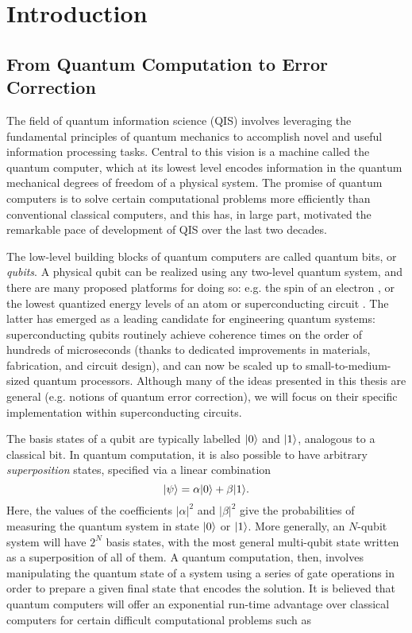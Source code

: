 \chapter{Introduction\label{ch:1_Introduction}}

\section{From Quantum Computation to Error Correction}

The field of quantum information science (QIS) involves leveraging the fundamental principles of quantum mechanics to accomplish novel and useful information processing tasks. Central to this vision is a machine called the quantum computer, which at its lowest level encodes information in the quantum mechanical degrees of freedom of a physical system. The promise of quantum computers is to solve certain computational problems more efficiently than conventional classical computers, and this has, in large part, motivated the remarkable pace of development of QIS over the last two decades. 

The low-level building blocks of quantum computers are called quantum bits, or \textit{qubits}. A physical qubit can be realized using any two-level quantum system, and there are many proposed platforms for doing so: e.g. the spin of an electron \cite{burkard2023semiconductor}, or the lowest quantized energy levels of an atom \cite{briegel2000quantum} or superconducting circuit \cite{devoret2013superconducting, krantz2019quantum, kjaergaard2020superconducting}. The latter has emerged as a leading candidate for engineering quantum systems: superconducting qubits routinely achieve coherence times on the order of hundreds of microseconds \cite{kjaergaard2020superconducting} (thanks to dedicated improvements in materials, fabrication, and circuit design), and can now be scaled up to small-to-medium-sized quantum processors. Although many of the ideas presented in this thesis are general (e.g. notions of quantum error correction), we will focus on their specific implementation within superconducting circuits. 

The basis states of a qubit are typically labelled $\lvert0\rangle$ and $\lvert1\rangle$, analogous to a classical bit. In quantum computation, it is also possible to have arbitrary \textit{superposition} states, specified via a linear combination
\begin{equation}
    \lvert\psi\rangle = \alpha\lvert0\rangle + \beta\lvert1\rangle.
\end{equation}
Here, the values of the coefficients $|\alpha|^2$ and $|\beta|^2$ give the probabilities of measuring the quantum system in state $\lvert0\rangle$ or $\lvert1\rangle$. More generally, an $N$-qubit system will have $2^N$ basis states, with the most general multi-qubit state written as a superposition of all of them. A quantum computation, then, involves manipulating the quantum state of a system using a series of gate operations in order to prepare a given final state that encodes the solution. It is believed that quantum computers will offer an exponential run-time advantage over classical computers for certain difficult computational problems such as 


